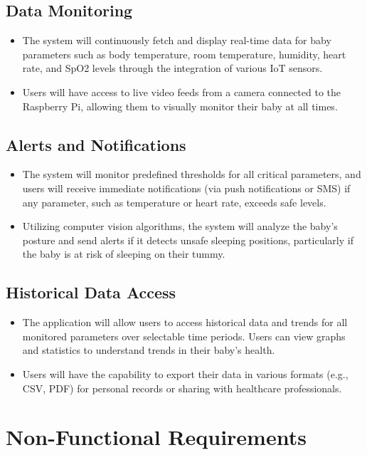 \documentclass[12pt,a4paper]{report}
\begin{document}
\subsection{Data Monitoring}
\begin{itemize}
  \item The system will continuously fetch and display real-time data for baby parameters such as body temperature, room temperature, humidity, heart rate, and SpO2 levels through the integration of various IoT sensors.
  \item Users will have access to live video feeds from a camera connected to the Raspberry Pi, allowing them to visually monitor their baby at all times.
\end{itemize}

\subsection{Alerts and Notifications}
\begin{itemize}
  \item The system will monitor predefined thresholds for all critical parameters, and users will receive immediate notifications (via push notifications or SMS) if any parameter, such as temperature or heart rate, exceeds safe levels.
  \item Utilizing computer vision algorithms, the system will analyze the baby’s posture and send alerts if it detects unsafe sleeping positions, particularly if the baby is at risk of sleeping on their tummy.
\end{itemize}

\subsection{Historical Data Access}
\begin{itemize}
  \item The application will allow users to access historical data and trends for all monitored parameters over selectable time periods. Users can view graphs and statistics to understand trends in their baby's health.
  \item Users will have the capability to export their data in various formats (e.g., CSV, PDF) for personal records or sharing with healthcare professionals.
\end{itemize}

\section{Non-Functional Requirements}
\end{document}
